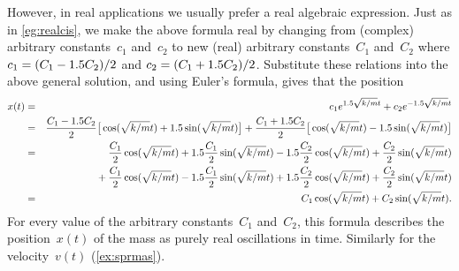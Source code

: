 \begin{OmitV1}
\begin{example}
\begin{solution}
However, in real applications we usually prefer a real algebraic expression.
Just as in \cref{eg:realcis}, we make the above formula real by changing from (complex) arbitrary constants~\(c_1\) and~\(c_2\) to new (real) arbitrary constants~\(C_1\) and~\(C_2\) where \(c_1=(C_1-1.5 C_2)/2\) and \(c_2=(C_1+1.5 C_2)/2\).
Substitute these relations into the above general solution, and using Euler's formula, gives that the position
\begin{eqnarray*}
x(t)&=&c_1e^{1.5\sqrt{k/m}t}+c_2e^{-1.5\sqrt{k/m}t}
\\&=&\frac{C_1-1.5 C_2}2\big[\cos(\sqrt{k/m}t)+1.5\sin(\sqrt{k/m}t)\big]
+\frac{C_1+1.5 C_2}2\big[\cos(\sqrt{k/m}t)-1.5\sin(\sqrt{k/m}t)\big]
\\&=&
\frac{C_1}2\cos(\sqrt{k/m}t)+1.5\frac{C_1}2\sin(\sqrt{k/m}t)
-1.5\frac{C_2}2\cos(\sqrt{k/m}t)+\frac{C_2}2\sin(\sqrt{k/m}t)
\\&&{}
+\frac{C_1}2\cos(\sqrt{k/m}t)-1.5\frac{C_1}2\sin(\sqrt{k/m}t)
+1.5\frac{C_2}2\cos(\sqrt{k/m}t)+\frac{C_2}2\sin(\sqrt{k/m}t)
\\&=&C_1\cos(\sqrt{k/m}t)+C_2\sin(\sqrt{k/m}t).
\end{eqnarray*}
For every value of the arbitrary constants~\(C_1\) and~\(C_2\), this formula describes the position~\(x(t)\) of the mass as purely real oscillations in time.
Similarly for the velocity~\(v(t)\) (\cref{ex:sprmas}).
\end{solution}
\end{example}
\endgroup
\end{OmitV1}







\begin{comment}
Probable section includes Cayley--Hamilton theorem: recall \cref{sec:mpmev}, compute powers of matrices, then C-H.
Other applications include Markov chains.

Possibly develop a little more theory on similarity of matrices and coordinate transform of matrices.  Then Jordan form and solving non-diagonalizable systems of differential equations.

Possibly something on {Emergent quasi-stationary dynamics of metastable states} but perhaps done in 7.1.2--3. (Can one have too many buzz-words?)
\end{comment}















